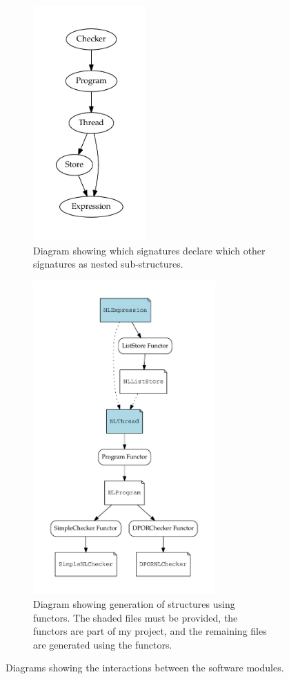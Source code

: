 \documentclass[12pt,a4paper,twoside,openright]{report}
\begin{document}
\begin{figure}
	\centering
	\begin{subfigure}{.4\textwidth}
		\centering
		\includegraphics[height=9cm]{interfaces}
		\caption{Diagram showing which signatures declare
			which other signatures as nested sub-structures.}
		\label{fig:interfaces}
	\end{subfigure}%
	\quad
	\begin{subfigure}{.5\textwidth}
		\centering
		\includegraphics[height=12cm]{functors}
		\caption{Diagram showing generation of
			structures using functors.
			The shaded files must be provided,
			the functors are part of my project,
			and the remaining files
			are generated using the functors.}
		\label{fig:functors}
	\end{subfigure}
	\caption{Diagrams showing the interactions between
		the software modules.}
	\label{fig:design}
\end{figure}
\end{document}
